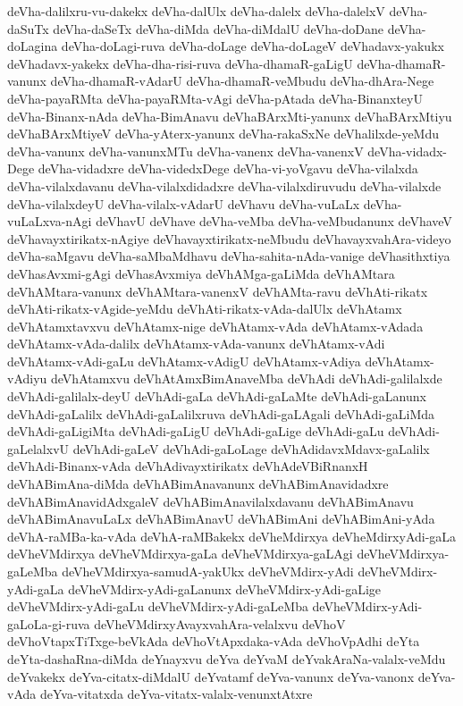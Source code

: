 {deVha-dalilxru-vu-dakekx
deVha-dalUlx
deVha-dalelx
deVha-dalelxV
deVha-daSuTx
deVha-daSeTx
deVha-diMda
deVha-diMdalU
deVha-doDane
deVha-doLagina
deVha-doLagi-ruva
deVha-doLage
deVha-doLageV
deVhadavx-yakukx
deVhadavx-yakekx
deVha-dha-risi-ruva
deVha-dhamaR-gaLigU
deVha-dhamaR-vanunx
deVha-dhamaR-vAdarU
deVha-dhamaR-veMbudu
deVha-dhAra-Nege
deVha-payaRMta
deVha-payaRMta-vAgi
deVha-pAtada
deVha-BinanxteyU
deVha-Binanx-nAda
deVha-BimAnavu
deVhaBArxMti-yanunx
deVhaBArxMtiyu
deVhaBArxMtiyeV
deVha-yAterx-yanunx
deVha-rakaSxNe
deVhalilxde-yeMdu
deVha-vanunx
deVha-vanunxMTu
deVha-vanenx
deVha-vanenxV
deVha-vidadx-Dege
deVha-vidadxre
deVha-videdxDege
deVha-vi-yoVgavu
deVha-vilalxda
deVha-vilalxdavanu
deVha-vilalxdidadxre
deVha-vilalxdiruvudu
deVha-vilalxde
deVha-vilalxdeyU
deVha-vilalx-vAdarU
deVhavu
deVha-vuLaLx
deVha-vuLaLxva-nAgi
deVhavU
deVhave
deVha-veMba
deVha-veMbudanunx
deVhaveV
deVhavayxtirikatx-nAgiye
deVhavayxtirikatx-neMbudu
deVhavayxvahAra-videyo
deVha-saMgavu
deVha-saMbaMdhavu
deVha-sahita-nAda-vanige
deVhasithxtiya
deVhasAvxmi-gAgi
deVhasAvxmiya
deVhAMga-gaLiMda
deVhAMtara
deVhAMtara-vanunx
deVhAMtara-vanenxV
deVhAMta-ravu
deVhAti-rikatx
deVhAti-rikatx-vAgide-yeMdu
deVhAti-rikatx-vAda-dalUlx
deVhAtamx
deVhAtamxtavxvu
deVhAtamx-nige
deVhAtamx-vAda
deVhAtamx-vAdada
deVhAtamx-vAda-dalilx
deVhAtamx-vAda-vanunx
deVhAtamx-vAdi
deVhAtamx-vAdi-gaLu
deVhAtamx-vAdigU
deVhAtamx-vAdiya
deVhAtamx-vAdiyu
deVhAtamxvu
deVhAtAmxBimAnaveMba
deVhAdi
deVhAdi-galilalxde
deVhAdi-galilalx-deyU
deVhAdi-gaLa
deVhAdi-gaLaMte
deVhAdi-gaLanunx
deVhAdi-gaLalilx
deVhAdi-gaLalilxruva
deVhAdi-gaLAgali
deVhAdi-gaLiMda
deVhAdi-gaLigiMta
deVhAdi-gaLigU
deVhAdi-gaLige
deVhAdi-gaLu
deVhAdi-gaLelalxvU
deVhAdi-gaLeV
deVhAdi-gaLoLage
deVhAdidavxMdavx-gaLalilx
deVhAdi-Binanx-vAda
deVhAdivayxtirikatx
deVhAdeVBiRnanxH
deVhABimAna-diMda
deVhABimAnavanunx
deVhABimAnavidadxre
deVhABimAnavidAdxgaleV
deVhABimAnavilalxdavanu
deVhABimAnavu
deVhABimAnavuLaLx
deVhABimAnavU
deVhABimAni
deVhABimAni-yAda
deVhA-raMBa-ka-vAda
deVhA-raMBakekx
deVheMdirxya
deVheMdirxyAdi-gaLa
deVheVMdirxya
deVheVMdirxya-gaLa
deVheVMdirxya-gaLAgi
deVheVMdirxya-gaLeMba
deVheVMdirxya-samudA-yakUkx
deVheVMdirx-yAdi
deVheVMdirx-yAdi-gaLa
deVheVMdirx-yAdi-gaLanunx
deVheVMdirx-yAdi-gaLige
deVheVMdirx-yAdi-gaLu
deVheVMdirx-yAdi-gaLeMba
deVheVMdirx-yAdi-gaLoLa-gi-ruva
deVheVMdirxyAvayxvahAra-velalxvu
deVhoV
deVhoVtapxTiTxge-beVkAda
deVhoVtApxdaka-vAda
deVhoVpAdhi
deYta
deYta-dashaRna-diMda
deYnayxvu
deYva
deYvaM
deYvakAraNa-valalx-veMdu
deYvakekx
deYva-citatx-diMdalU
deYvatamf
deYva-vanunx
deYva-vanonx
deYva-vAda
deYva-vitatxda
deYva-vitatx-valalx-venunxtAtxre
}
